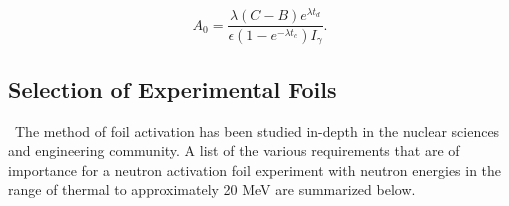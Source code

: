 \begin{equation} \label{eq:MeasActivity}
A_{0} = \frac{\lambda (C-B) e^{\lambda t_{d}}}{\epsilon (1-e^{-\lambda 
t_{c}})I_{\gamma}}.
\end{equation}


\subsection{Selection of Experimental Foils}\label{FoilsHere}
\ The method of foil activation has been studied in-depth in the 
nuclear sciences and engineering community. A list of the various 
requirements that are of importance for a neutron activation foil experiment 
with neutron energies in the range of thermal to approximately 20 MeV are summarized below\cite{Knoll,Luciano2012a,Kuijpers1977}.

